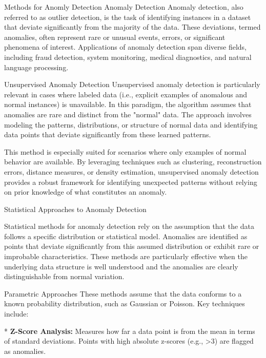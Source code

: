 \chap Methods for Anomly Detection
\sec Anomaly Detection
Anomaly detection, also referred to as outlier detection, is the task of identifying instances in a dataset that deviate significantly from the majority of the data. These deviations, termed anomalies, often represent rare or unusual events, errors, or significant phenomena of interest. Applications of anomaly detection span diverse fields, including fraud detection, system monitoring, medical diagnostics, and natural language processing.


\secc Unsupervised Anomaly Detection
Unsupervised anomaly detection is particularly relevant in cases where labeled data (i.e., explicit examples of anomalous and normal instances) is unavailable. In this paradigm, the algorithm assumes that anomalies are rare and distinct from the "normal" data. The approach involves modeling the patterns, distributions, or structure of normal data and identifying data points that deviate significantly from these learned patterns.

This method is especially suited for scenarios where only examples of normal behavior are available. By leveraging techniques such as clustering, reconstruction errors, distance measures, or density estimation, unsupervised anomaly detection provides a robust framework for identifying unexpected patterns without relying on prior knowledge of what constitutes an anomaly.

\sec Statistical Approaches to Anomaly Detection

Statistical methods for anomaly detection rely on the assumption that the data follows a specific distribution or statistical model. Anomalies are identified as points that deviate significantly from this assumed distribution or exhibit rare or improbable characteristics. These methods are particularly effective when the underlying data structure is well understood and the anomalies are clearly distinguishable from normal variation.

\secc Parametric Approaches
These methods assume that the data conforms to a known probability distribution, such as Gaussian or Poisson. Key techniques include:

\begitems
* {\bf Z-Score Analysis:}\nl
Measures how far a data point is from the mean in terms of standard deviations. Points with high absolute z-scores (e.g., >3) are flagged as anomalies.


